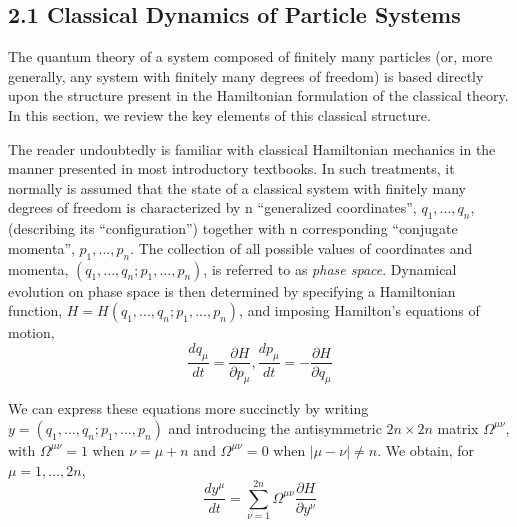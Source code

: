 \documentclass[11pt,a4paper]{article}
\begin{document}
\subsection*{2.1 Classical Dynamics of Particle Systems}\hypertarget{sec:2.1}{}

The quantum theory of a system composed of finitely many particles (or, more generally, any system with finitely many degrees \hypertarget{source-24}{} of freedom) is based directly upon the structure present in the Hamiltonian formulation of the classical theory. In this section, we review the key elements of this classical structure.

The reader undoubtedly is familiar with classical Hamiltonian mechanics in the manner presented in most introductory textbooks. In such treatments, it normally is assumed that the state of a classical system with finitely many degrees of freedom is characterized by n ``generalized coordinates'', \(q_1,...,q_n\), (describing its ``configuration'') together with n corresponding ``conjugate momenta'', \(p_1,...,p_n\). The collection of all possible values of coordinates and momenta, \((q_1,...,q_n; p_1,...,p_n)\), is referred to as \emph{phase space}. Dynamical evolution on phase space is then determined by specifying a Hamiltonian function, \(H = H(q_1,...,q_n; p_1,...,p_n)\), and imposing Hamilton's equations of motion,
\begin{equation*}
\frac{dq_{\mu}}{dt} = \frac{\partial H}{\partial p_{\mu}}, \frac{dp_{\mu}}{dt} = -\frac{\partial H}{\partial q_{\mu}} \tag{2.1.1}\label{eq:2.1.1}
\end{equation*}

We can express these equations more succinctly by writing \(y=(q_1,\ldots,q_n; p_1,\ldots,p_n)\) and introducing the antisymmetric \(2n\times 2n\) matrix \(\Omega^{\mu\nu}\), with \(\Omega^{\mu\nu}=1\) when \(\nu=\mu+n\) and \(\Omega^{\mu\nu}=0\) when \(|\mu-\nu|\neq n\). We obtain, for \(\mu=1,\ldots,2n\),
\begin{equation*}
\frac{dy^{\mu}}{dt} = \sum_{\nu=1}^{2n} \Omega^{\mu\nu} \frac{\partial H}{\partial y^{\nu}} \tag{2.1.2}\label{eq:2.1.2}
\end{equation*}
\end{document}
